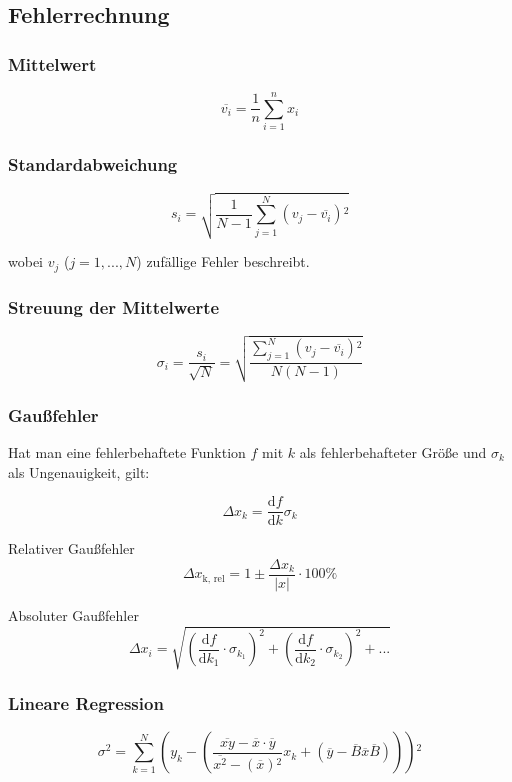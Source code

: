 \subsection{Fehlerrechnung}
\label{subsec:fehlerrechnung}

\subsubsection{Mittelwert}
\begin{equation}
\overline{v_i} = \frac{1}{n} \sum_{i=1}^n x_i
\end{equation}

\subsubsection{Standardabweichung}
\begin{equation}
s_i = \sqrt{\frac{1}{N - 1} \sum_{j=1}^N \left(v_j - \overline{v_i}\right){^2}}
\end{equation}

wobei $v_j$ ($j = 1, ..., N$) zufällige Fehler beschreibt.

\subsubsection{Streuung der Mittelwerte}
\begin{equation}
\sigma_i = \frac{s_i}{\sqrt{N}} = \sqrt{\frac{\sum_{j=1}^N \left(v_j - \overline{v_i}\right){^2}}{N \left(N - 1 \right)}}
\end{equation}

\subsubsection{Gaußfehler}
Hat man eine fehlerbehaftete Funktion $f$ mit $k$ als fehlerbehafteter Größe und $\sigma_k$ als Ungenauigkeit, gilt:

\begin{equation}
\Delta x_k = \frac{\mathrm{d}f}{\mathrm{d}k}\sigma_k
\end{equation}

Relativer Gaußfehler
\begin{equation}
\Delta x_\text{k, rel} = 1 \pm \frac{\Delta x_k}{|x|}\cdot 100\%
\end{equation}

Absoluter Gaußfehler
\begin{equation}
\Delta x_i = \sqrt{\left(\frac{\mathrm{d}f}{\mathrm{d}k_{1}}\cdot \sigma_{k_{1}}\right)^2 + \left(\frac{\mathrm{d}f}{\mathrm{d}k_{2}}\cdot \sigma_{k_{2}}\right)^2 + ...}
\end{equation}

\subsubsection{Lineare Regression}
\begin{equation}
\sigma {^2} = \sum_{k=1}^{N} \left(y_k - \left(\frac{\overline{xy} - \overline{x}\cdot\overline{y}}{\overline{x^2} - (\overline{x}){^2}}x_k + \left(\overline{y} - \overline{B}\overline{x}\overline{B}\right)\right)\right){^2}
\end{equation}
